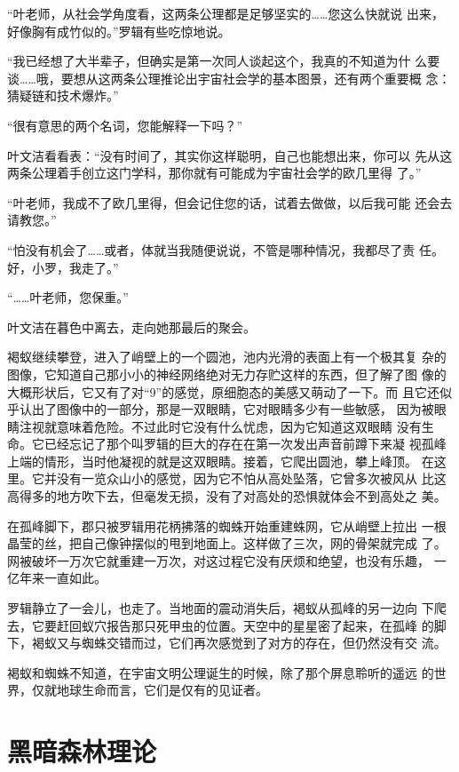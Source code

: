 “叶老师，从社会学角度看，这两条公理都是足够坚实的……您这么快就说
出来，好像胸有成竹似的。”罗辑有些吃惊地说。

“我已经想了大半辈子，但确实是第一次同人谈起这个，我真的不知道为什
么要谈……哦，要想从这两条公理推论出宇宙社会学的基本图景，还有两个重要概
念：猜疑链和技术爆炸。”

“很有意思的两个名词，您能解释一下吗？”

叶文洁看看表：“没有时间了，其实你这样聪明，自己也能想出来，你可以
先从这两条公理着手创立这门学科，那你就有可能成为宇宙社会学的欧几里得
了。”

“叶老师，我成不了欧几里得，但会记住您的话，试着去做做，以后我可能
还会去请教您。”

“怕没有机会了……或者，体就当我随便说说，不管是哪种情况，我都尽了责
任。好，小罗，我走了。”

“……叶老师，您保重。”

叶文洁在暮色中离去，走向她那最后的聚会。

褐蚁继续攀登，进入了峭壁上的一个圆池，池内光滑的表面上有一个极其复
杂的图像，它知道自己那小小的神经网络绝对无力存贮这样的东西，但了解了图
像的大概形状后，它又有了对“9”的感觉，原细胞态的美感又萌动了一下。而
且它还似乎认出了图像中的一部分，那是一双眼睛，它对眼睛多少有一些敏感，
因为被眼睛注视就意味着危险。不过此时它没有什么忧虑，因为它知道这双眼睛
没有生命。它已经忘记了那个叫罗辑的巨大的存在在第一次发出声音前蹲下来凝
视孤峰上端的情形，当时他凝视的就是这双眼睛。接着，它爬出圆池，攀上峰顶。
在这里。它并没有一览众山小的感觉，因为它不怕从高处坠落，它曾多次被风从
比这高得多的地方吹下去，但毫发无损，没有了对高处的恐惧就体会不到高处之
美。

在孤峰脚下，郡只被罗辑用花柄拂落的蜘蛛开始重建蛛网，它从峭壁上拉出
一根晶莹的丝，把自己像钟摆似的甩到地面上。这样做了三次，网的骨架就完成
了。网被破坏一万次它就重建一万次，对这过程它没有厌烦和绝望，也没有乐趣，
一亿年来一直如此。

罗辑静立了一会儿，也走了。当地面的震动消失后，褐蚁从孤峰的另一边向
下爬去，它要赶回蚁穴报告那只死甲虫的位置。天空中的星星密了起来，在孤峰
的脚下，褐蚁又与蜘蛛交错而过，它们再次感觉到了对方的存在，但仍然没有交
流。

褐蚁和蜘蛛不知道，在宇宙文明公理诞生的时候，除了那个屏息聆听的遥远
的世界，仅就地球生命而言，它们是仅有的见证者。\cite{threebody}

\section{黑暗森林理论}


